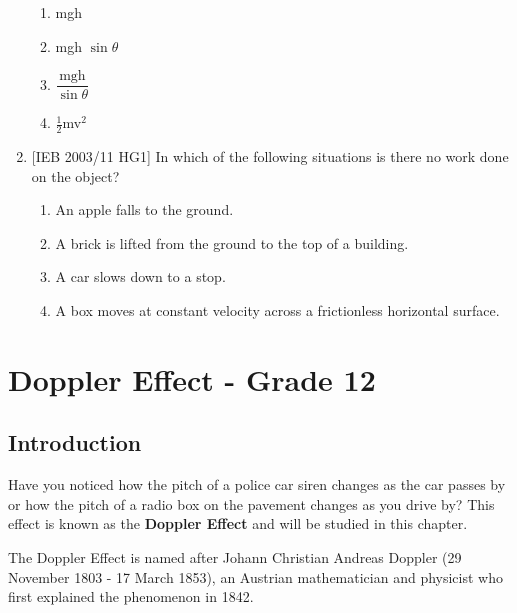 \begin{enumerate}
{\begin{enumerate}
\item{mgh}
\item{mgh $\sin \theta$}
\item{$\dfrac{\textrm{mgh}}{\sin \theta}$}
\item{$\tfrac{1}{2}$mv$^2$}
\end{enumerate}}

\item{[IEB 2003/11 HG1] In which of the following situations is there no work done on the object?

\begin{enumerate}
\item{An apple falls to the ground.}
\item{A brick is lifted from the ground to the top of a building.}
\item{A car slows down to a stop.}
\item{A box moves at constant velocity across a frictionless horizontal surface.}
\end{enumerate}
}

\end{enumerate}





\chapter{Doppler Effect - Grade 12}
\label{p:wsl:de12}


\section{Introduction}
Have you noticed how the pitch of a police car siren changes as the car passes by or how the pitch of a radio box on the pavement changes as you drive by? This effect is known as the \textbf{Doppler Effect} and will be studied in this chapter.
\begin{IFact}
{The Doppler Effect is named after Johann Christian Andreas Doppler (29 November 1803 - 17 March 1853), an Austrian mathematician and physicist who first explained the phenomenon in 1842.}
\end{IFact}

